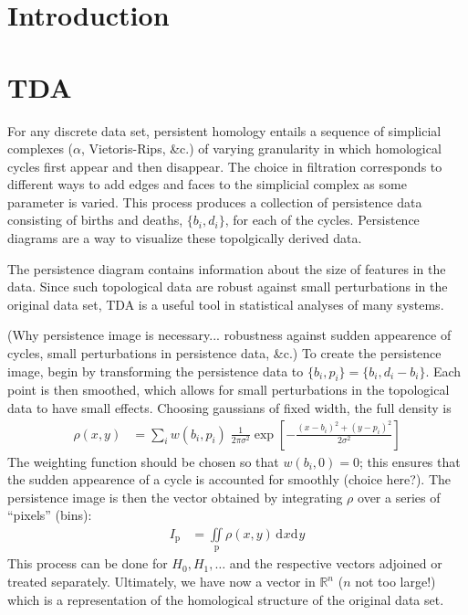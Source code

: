 \documentclass[11pt]{article}
\renewcommand{\d}[2][]{\mathrm{d}^{#1}{#2}}
\begin{document}
\section{Introduction}


\section{TDA}
For any discrete data set, persistent homology entails a sequence of simplicial complexes ($\alpha$, Vietoris-Rips, \&c.) of varying granularity in which homological cycles first appear and then disappear. The choice in filtration corresponds to different ways to add edges and faces to the simplicial complex as some parameter is varied. This process produces a collection of persistence data consisting of births and deaths, $\{b_i,d_i\}$, for each of the cycles. Persistence diagrams are a way to visualize these topolgically derived data.

The persistence diagram contains information about the size of features in the data. Since such topological data are robust against small perturbations in the original data set, TDA is a useful tool in statistical analyses of many systems.


(Why persistence image is necessary... robustness against sudden appearence of cycles, small perturbations in persistence data, \&c.) To create the persistence image, begin by transforming the persistence data to $\{b_i,p_i\}=\{b_i,d_i-b_i\}$. Each point is then smoothed, which allows for small perturbations in the topological data to have small effects. Choosing gaussians of fixed width, the full density is
\begin{align}
    \rho(x,y) &= \sum_i w(b_i,p_i)\;\frac{1}{2\pi\sigma^2}\exp\left[-\frac{(x-b_i)^2+(y-p_i)^2}{2\sigma^2}\right]
\end{align}
The weighting function should be chosen so that $w(b_i,0)=0$; this ensures that the sudden appearence of a cycle is accounted for smoothly (choice here?). The persistence image is then the vector obtained by integrating $\rho$ over a series of ``pixels'' (bins):
\begin{align}
    I_\text{p} &= \iint\limits_\text{p}\rho(x,y)\,\d{x}\d{y}
\end{align}
This process can be done for $H_0,H_1,\ldots$ and the respective vectors adjoined or treated separately. Ultimately, we have now a vector in $\mathbb{R}^n$ ($n$ not too large!) which is a representation of the homological structure of the original data set.
\end{document}
